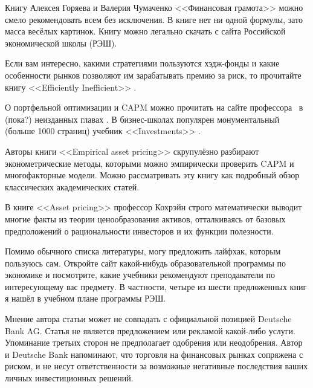 Книгу Алексея Горяева и Валерия Чумаченко <<Финансовая грамота>> 
\cite{goryaev2009} можно смело рекомендовать всем без исключения. В книге нет 
ни одной формулы, зато масса весёлых картинок. Книгу можно легально скачать с 
сайта Российской экономической школы (РЭШ).

Если вам интересно, какими стратегиями пользуются хэдж-фонды и какие 
особенности рынков позволяют им зарабатывать премию за риск, то прочитайте 
книгу <<Efficiently Inefficient>> \cite{pedersen2015efficiently}.

О портфельной оптимизации и CAPM можно прочитать на сайте профессора \ в (пока?) неизданных главах  
\cite{welch}. В бизнес-школах популярен монументальный (больше 1000 страниц) 
учебник <<Investments>> \cite{bodie2014investments}.

Авторы книги <<Empirical asset pricing>> \cite{bali2016empirical} скрупулёзно 
разбирают эконометрические методы, которыми можно эмпирически проверить CAPM и 
многофакторные модели. Можно рассматривать эту книгу как подробный обзор 
классических академических статей.

В книге <<Asset pricing>> \cite{cochrane2005asset} профессор Кохрэйн строго 
математически выводит многие факты из теории ценообразования активов, 
отталкиваясь от базовых предположений о рациональности инвесторов и их 
функции полезности.

Помимо обычного списка литературы, могу предложить лайфхак, которым пользуюсь 
сам. Откройте сайт какой-нибудь образовательной программы по экономике и 
посмотрите, какие учебники рекомендуют преподаватели по интересующему вас 
предмету. В частности, четыре из шести предложенных книг я нашёл в учебном 
плане программы
 РЭШ.


Мнение автора статьи может не совпадать с официальной позицией Deutsche Bank 
AG. Статья не является предложением или рекламой какой-либо услуги. Упоминание
третьих сторон не предполагает одобрения или неодобрения. Автор и Deutsche Bank
напоминают, что торговля на финансовых рынках сопряжена с риском, и не несут
ответственности за возможные негативные последствия ваших личных инвестиционных
решений.

\en{
\printbibliography[title = \ru{Список литературы}]
}
\printendnotes

